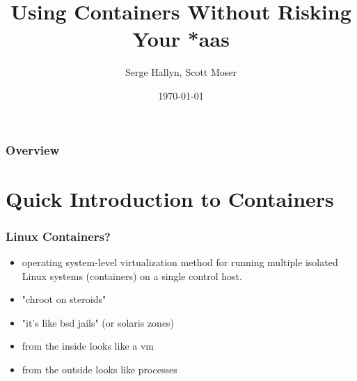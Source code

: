 \documentclass{beamer}
\title[User Namespaces]{Using Containers Without Risking Your *aas} %
\author{Serge Hallyn, Scott Moser} %
\institute[Canonical] %
{
Canonical, Inc \\ %
\medskip
\textit{serge.hallyn@ubuntu.com, scott.moser@canonical.com} %
}
\date{\today} %
\begin{document}
\begin{frame}
\titlepage %
\end{frame}

\begin{frame}
\frametitle{Overview} %
\tableofcontents %
\end{frame}


\section{Quick Introduction to Containers}
\begin{frame}
   \frametitle{Linux Containers?}
   \begin{itemize}
      \item operating system-level virtualization method for running multiple isolated Linux systems (containers) on a single control host.
      \item "chroot on steroids"
      \item "it's like bsd jails" (or solaris zones)
      \item from the inside looks like a vm
      \item from the outside looks like processes
    \end{itemize}
\end{frame}

\end{document}

